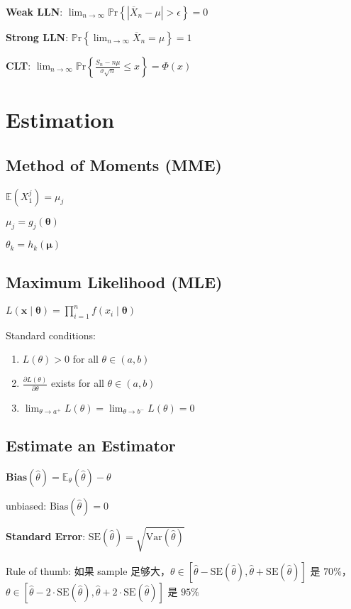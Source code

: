 \documentclass[9pt,landscape]{article}
\begin{document}
\begin{multicols}{3}
\textbf{Weak LLN}: $\lim_{n\to\infty}\mathbb{P}\mathrm{r}\left\{\left|\overline{X}_n-\mu\right|>\epsilon\right\}=0$

\textbf{Strong LLN}: $\mathbb{P}\mathrm{r}\left\{\lim_{n\to\infty}\overline{X}_n=\mu\right\}=1$

\textbf{CLT}: $\lim_{n\to\infty}\mathbb{P}\mathrm{r}\left\{\frac{S_n-n\mu}{\sigma\sqrt{n}}\le x\right\}=\Phi(x)$

\section{Estimation}

\subsection{Method of Moments (MME)}

$\mathbb{E}(X_1^j)=\mu_j$

$\mu_j=g_j(\boldsymbol{\theta})$

$\theta_k=h_k(\boldsymbol{\mu})$

\subsection{Maximum Likelihood (MLE)}

$L(\boldsymbol{x}\mid \boldsymbol{\theta})=\prod_{i=1}^n f(x_i\mid \boldsymbol{\theta})$

Standard conditions:
\begin{enumerate}
	\item $L(\theta)>0$ for all $\theta\in(a, b)$
	\item $\frac{\partial L(\theta)}{\partial\theta}$ exists for all $\theta\in (a, b)$
	\item $\lim_{\theta\to a^+}L(\theta)=\lim_{\theta\to b^-}L(\theta)=0$
\end{enumerate}

\subsection{Estimate an Estimator}

$\mathbf{Bias}(\hat\theta)=\mathbb{E}_\theta(\hat\theta)-\theta$

unbiased: $\mathrm{Bias}(\hat\theta)=0$

\textbf{Standard Error}: $\mathrm{SE}(\hat\theta)=\sqrt{\mathrm{Var}(\hat{\theta})}$

Rule of thumb: 如果 sample 足够大，$\theta\in[\hat{\theta}-\mathrm{SE}(\hat{\theta}),\hat{\theta}+\mathrm{SE}(\hat{\theta})]$ 是 $70\%$，$\theta\in[\hat{\theta}-2\cdot\mathrm{SE}(\hat{\theta}),\hat{\theta}+2\cdot\mathrm{SE}(\hat{\theta})]$ 是 $95\%$


\end{multicols}
\end{document}
